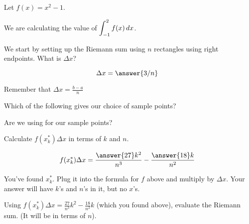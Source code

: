 \documentclass{ximera}
\author{Bobby Ramsey}
\begin{document}
\begin{exercise}
Let $f(x) = x^2-1$. 
		\begin{image}
		\end{image}

	We are calculating the value of $\displaystyle \int_{-1}^{2} f(x) \mathop{}\!d x$.



	We start by setting up the Riemann sum using $n$ rectangles using right endpoints.
	What is $\Delta x$?
	
	\[ \Delta x = \answer{3/n} \]
	\begin{hint}
		Remember that $\Delta x = \frac{b-a}{n}$
	\end{hint}
	\begin{exercise}
		Which of the following gives our choice of sample points?
		\begin{multipleChoice}
		\end{multipleChoice}
		\begin{hint}
			Are we using for our sample points?
		\end{hint}
		\begin{exercise}
			Calculate $f(x_k^*) \Delta x$ in terms of $k$ and $n$.
			
			\[ f(x_k^*) \Delta x = \frac{\answer{27}k^2}{n^3}-\frac{\answer{18}k}{n^2} \]
			\begin{hint}
				You've found $x_k^*$.  Plug it into the formula for $f$ above and multiply by $\Delta x$.
				Your answer will have $k$'s and $n$'s in it, but no $x$'s.
			\end{hint}
			\begin{exercise}
				Using $f(x_k^*)\Delta x = \frac{27}{n^3}k^2 - \frac{18}{n^2}k$ (which you found above), evaluate the Riemann sum.  (It will be in terms of $n$).
				

\end{exercise}
\end{exercise}
\end{exercise}
\end{exercise}
\end{document}

